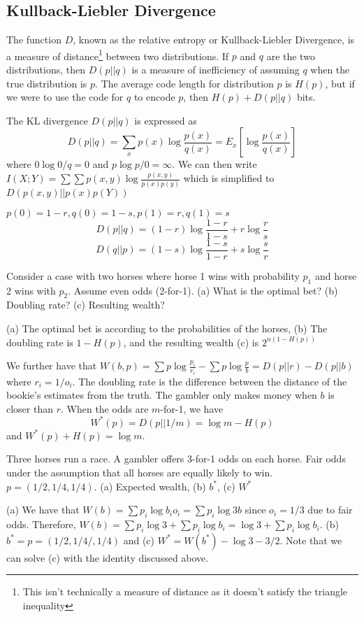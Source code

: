 \documentclass[11pt]{article}
\theoremstyle{definition}
\begin{document}
\subsection{Kullback-Liebler Divergence}

The function $D$, known as the relative entropy or Kullback-Liebler Divergence, is a measure of distance\footnote{This isn't technically a measure of distance as it doesn't satisfy the triangle inequality} between two distributions. If $p$ and $q$ are the two distributions, then $D(p || q)$ is a measure of inefficiency of assuming $q$ when the true distribution is $p$. The average code length for distribution $p$ is $H(p)$, but if we were to use the code for $q$ to encode $p$, then $H(p) + D(p||q)$ bits. 

 The KL divergence $D(p||q)$ is expressed as $$D(p||q) = \sum_x p(x) \log \frac{p(x)}{q(x)} = E_x \left[ \log \frac{p(x)}{q(x)} \right] $$ where $0 \log 0/q = 0$ and $p \log p / 0 = \infty$. We can then write $I(X; Y) = \sum \sum p(x, y) \log \frac{p(x, y)}{p(x) p(y)}$ which is simplified to $D(p(x, y) || p(x) p(Y))$

\example $p(0) = 1-r, q(0) = 1-s, p(1) = r, q(1) = s$
$$D(p||q) = (1-r) \log \frac{1-r}{1-s} + r \log \frac{r}{s}$$ 
$$D(q||p) = (1-s) \log \frac{1-s}{1-r} + s \log \frac{s}{r}$$

\example Consider a case with two horses where horse 1 wins with probability $p_1$ and horse 2 wins with $p_2$. Assume even odds (2-for-1). (a) What is the optimal bet? (b) Doubling rate? (c) Resulting wealth? 

(a) The optimal bet is according to the probabilities of the horses, (b) The doubling rate is $1-H(p)$, and the resulting wealth (c) is $2^{n(1-H(p))}$

We further have that $W(b, p) = \sum p \log \frac{p_i}{r_i} - \sum p \log \frac{p}{b} = D(p || r) - D(p || b)$ where $r_i = 1/o_i$. The doubling rate is the difference between the distance of the bookie's estimates from the truth. The gambler only makes money when $b$ is closer than $r$. When the odds are $m$-for-1, we have $$W^*(p) = D(p || 1/m)= \log m - H(p)$$and $W^*(p) + H(p) = \log m$.
 
 \example Three horses run a race. A gambler offers 3-for-1 odds on each horse. Fair odds under the assumption that all horses are equally likely to win. $p = (1/2, 1/4, 1/4)$. (a) Expected wealth, (b) $b^*$, (c) $W^*$
 
(a) We have that $W(b) = \sum p_i \log b_i o_i = \sum p_i \log 3b$ since $o_i = 1/3$ due to fair odds. Therefore, $W(b) = \sum p_i \log 3 + \sum p_i \log b_i = \log 3 + \sum p_i \log b_i$. (b) $b^* = p = (1/2, 1/4/, 1/4)$ and (c) $W^* = W(b^*) - \log 3 - 3/2$. Note that we can solve (c) with the identity discussed above. 
\end{document}
